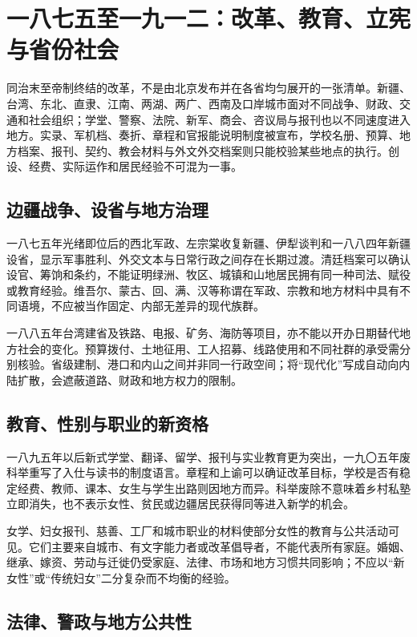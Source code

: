 \section{一八七五至一九一二：改革、教育、立宪与省份社会}
\label{sec:late-qing-reform-constitution-provincial-global}

同治末至帝制终结的改革，不是由北京发布并在各省均匀展开的一张清单。新疆、台湾、东北、直隶、江南、两湖、两广、西南及口岸城市面对不同战争、财政、交通和社会组织；学堂、警察、法院、新军、商会、咨议局与报刊也以不同速度进入地方。实录、军机档、奏折、章程和官报能说明制度被宣布，学校名册、预算、地方档案、报刊、契约、教会材料与外文外交档案则只能校验某些地点的执行。创设、经费、实际运作和居民经验不可混为一事。

\subsection{边疆战争、设省与地方治理}

一八七五年光绪即位后的西北军政、左宗棠收复新疆、伊犁谈判和一八八四年新疆设省，显示军事胜利、外交文本与日常行政之间存在长期过渡。清廷档案可以确认设官、筹饷和条约，不能证明绿洲、牧区、城镇和山地居民拥有同一种司法、赋役或教育经验。维吾尔、蒙古、回、满、汉等称谓在军政、宗教和地方材料中具有不同语境，不应被当作固定、内部无差异的现代族群。

一八八五年台湾建省及铁路、电报、矿务、海防等项目，亦不能以开办日期替代地方社会的变化。预算拨付、土地征用、工人招募、线路使用和不同社群的承受需分别核验。省级建制、港口和内山之间并非同一行政空间；将“现代化”写成自动向内陆扩散，会遮蔽道路、财政和地方权力的限制。

\subsection{教育、性别与职业的新资格}

一八九五年以后新式学堂、翻译、留学、报刊与实业教育更为突出，一九〇五年废科举重写了入仕与读书的制度语言。章程和上谕可以确证改革目标，学校是否有稳定经费、教师、课本、女生与学生出路则因地方而异。科举废除不意味着乡村私塾立即消失，也不表示女性、贫民或边疆居民获得同等进入新学的机会。

女学、妇女报刊、慈善、工厂和城市职业的材料使部分女性的教育与公共活动可见。它们主要来自城市、有文字能力者或改革倡导者，不能代表所有家庭。婚姻、继承、嫁资、劳动与迁徙仍受家庭、法律、市场和地方习惯共同影响；不应以“新女性”或“传统妇女”二分复杂而不均衡的经验。

\subsection{法律、警政与地方公共性}

